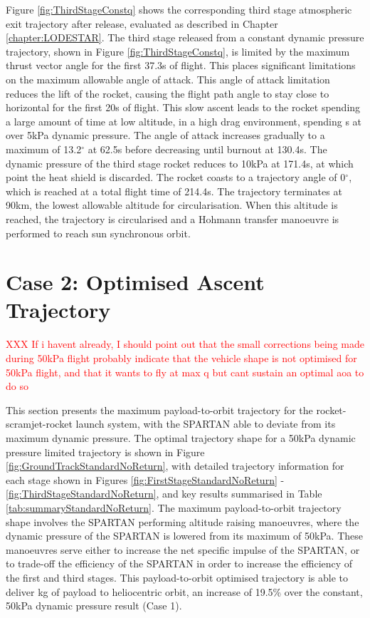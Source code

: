 Figure \ref{fig:ThirdStageConstq} shows the corresponding third stage atmospheric exit trajectory after release, evaluated as described in Chapter \ref{chapter:LODESTAR}. The third stage released from a constant dynamic pressure trajectory, shown in Figure \ref{fig:ThirdStageConstq}, is limited by the maximum thrust vector angle for the first 37.3s of flight. This places significant limitations on the maximum allowable angle of attack. This angle of attack limitation reduces the lift of the rocket, causing the flight path angle to stay close to horizontal for the first 20s of flight. This slow ascent leads to the rocket spending a large amount of time at low altitude, in a high drag environment, spending \thirdqOverFiveConstqNoReturn s at over 5kPa dynamic pressure. The angle of attack increases gradually to a maximum of 13.2$^\circ$ at 62.5s before decreasing until burnout at 130.4s. The dynamic pressure of the third stage rocket reduces to 10kPa at 171.4s, at which point the heat shield is discarded. The rocket coasts to a trajectory angle of 0$^\circ$, which is reached at a total flight time of 214.4s. The trajectory terminates at 90km, the lowest allowable altitude for circularisation. 
When this altitude is reached, the trajectory is circularised and a Hohmann transfer manoeuvre is performed to reach sun synchronous orbit.






\section{Case 2: Optimised Ascent Trajectory}\label{sec:optimisednoreturn}

\textcolor{red}{XXX If i havent already, I should point out that the small corrections being made during 50kPa flight probably indicate that the vehicle shape is not optimised for 50kPa flight, and that it wants to fly at max q but cant sustain an optimal aoa to do so}

This section presents the maximum payload-to-orbit trajectory for the rocket-scramjet-rocket launch system, with the SPARTAN able to deviate from its maximum dynamic pressure. 
The optimal trajectory shape for a 50kPa dynamic pressure limited trajectory is shown in Figure \ref{fig:GroundTrackStandardNoReturn}, with detailed trajectory information for each stage shown in Figures \ref{fig:FirstStageStandardNoReturn} - \ref{fig:ThirdStageStandardNoReturn}, and key results summarised in Table \ref{tab:summaryStandardNoReturn}. The maximum payload-to-orbit trajectory shape involves the SPARTAN performing altitude raising manoeuvres, where the dynamic pressure of the SPARTAN is lowered from its maximum of 50kPa. These manoeuvres serve either to increase the net specific impulse of the SPARTAN, or to trade-off the efficiency of the SPARTAN in order to increase the efficiency of the first and third stages. 
This payload-to-orbit optimised trajectory is able to deliver \PayloadToOrbitStandardNoReturn kg of payload to heliocentric orbit, an increase of 19.5\% over the constant, 50kPa dynamic pressure result (Case 1).

